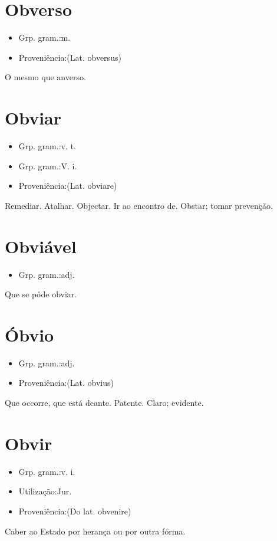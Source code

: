 \section{Obverso}
\begin{itemize}
\item {Grp. gram.:m.}
\end{itemize}
\begin{itemize}
\item {Proveniência:(Lat. \textunderscore obversus\textunderscore )}
\end{itemize}
O mesmo que \textunderscore anverso\textunderscore .
\section{Obviar}
\begin{itemize}
\item {Grp. gram.:v. t.}
\end{itemize}
\begin{itemize}
\item {Grp. gram.:V. i.}
\end{itemize}
\begin{itemize}
\item {Proveniência:(Lat. \textunderscore obviare\textunderscore )}
\end{itemize}
Remediar.
Atalhar.
Objectar.
Ir ao encontro de.
Obstar; tomar prevenção.
\section{Obviável}
\begin{itemize}
\item {Grp. gram.:adj.}
\end{itemize}
Que se póde obviar.
\section{Óbvio}
\begin{itemize}
\item {Grp. gram.:adj.}
\end{itemize}
\begin{itemize}
\item {Proveniência:(Lat. \textunderscore obvius\textunderscore )}
\end{itemize}
Que occorre, que está deante.
Patente.
Claro; evidente.
\section{Obvir}
\begin{itemize}
\item {Grp. gram.:v. i.}
\end{itemize}
\begin{itemize}
\item {Utilização:Jur.}
\end{itemize}
\begin{itemize}
\item {Proveniência:(Do lat. \textunderscore obvenire\textunderscore )}
\end{itemize}
Caber ao Estado por herança ou por outra fórma.
